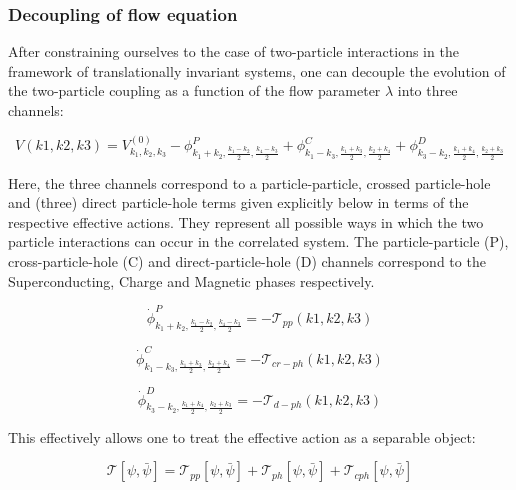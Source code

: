 \documentclass[12pt]{article}
\begin{document}
\subsubsection{Decoupling of flow equation}
After constraining ourselves to the case of two-particle interactions in the framework of translationally invariant systems, one can decouple  the evolution of the two-particle coupling as a function of the flow parameter $\lambda$ into three channels:

\begin{equation} \label{V decoupling}
    V(k1,k2,k3)= V_{k_1, k_2, k_3}^{(0)} - \phi^{P}_{k_1 +k_2, \frac{k_1 - k_2}{2}, \frac{k_4-k_3}{2}} + \phi^{C}_{k_1 - k_3, \frac{k_1 +k_3}{2}, \frac{k_2+k_4}{2}} +\phi^{D}_{k_3- k_2, \frac{k_1 + k_4}{2}, \frac{k_2+k_3}{2}}
\end{equation}

\noindent Here, the three channels correspond to a particle-particle, crossed particle-hole and (three) direct particle-hole terms given explicitly below in terms of the respective effective actions. They represent all possible ways in which the two particle interactions can occur in the correlated system. The particle-particle (P), cross-particle-hole (C) and direct-particle-hole (D) channels
correspond to the Superconducting, Charge and Magnetic phases respectively. 

\begin{equation}
    \dot{\phi}^{P}_{k_1 +k_2, \frac{k_1 - k_2}{2}, \frac{k_4-k_3}{2}} = - \mathcal{T}_{pp}(k1,k2,k3)
\end{equation}


\begin{equation}
    \dot{\phi}^{C}_{k_1 - k_3, \frac{k_1 +k_3}{2}, \frac{k_2+k_4}{2}} = - \mathcal{T}_{cr-ph}(k1,k2,k3)
\end{equation}

\begin{equation}
    \dot{\phi}^{D}_{k_3- k_2, \frac{k_1 + k_4}{2}, \frac{k_2+k_3}{2}} = - \mathcal{T}_{d-ph}(k1,k2,k3)
\end{equation}

\noindent This effectively allows one to treat the effective action as a separable object:

\begin{equation}
    \mathcal{T}[\psi, \bar{\psi}] = \mathcal{T}_{pp}[\psi, \bar{\psi}] + \mathcal{T}_{ph}[\psi, \bar{\psi}] + \mathcal{T}_{cph}[\psi, \bar{\psi}]
\end{equation}
\end{document}
